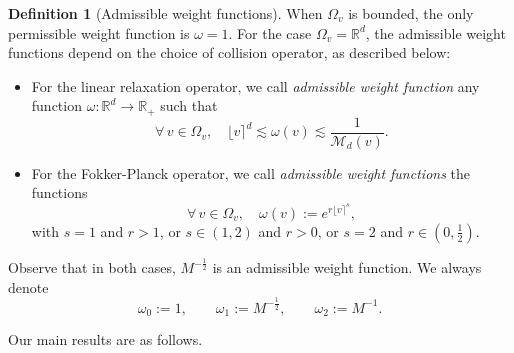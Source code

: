 \documentclass[11pt]{amsart}
\theoremstyle{definition}
\newtheorem{definition}[theorem]{Definition}
\theoremstyle{remark}
\numberwithin{equation}{section}
\newcommand\R{{\mathbb R}}
\def\MMM{{\mathscr M}}
\newcommand{\wangle}[1]{\lfloor #1 \rceil}
\begin{document}
\begin{definition}[Admissible weight functions]
  \label{def:admissible}
  When $\Omega_v$ is bounded, the only permissible weight function is $\omega = 1$. For the case $\Omega_v = \mathbb{R}^d$, the admissible weight functions depend on the choice of collision operator, as described below:
  \begin{itemize}
 
  \item[(i)] For the linear relaxation operator, we call \emph{admissible weight function} any function $\omega : \R^d \to \R_+$ such that
    \begin{equation*}
      \forall \, v \in \Omega_v, \quad \wangle{v}^d \lesssim \omega(v) \lesssim \frac{1}{\MMM_d(v)}.
    \end{equation*}
    \smallskip

    
  \item[(ii)] For the Fokker-Planck operator, we call \emph{admissible weight functions} the functions
    \begin{equation*}
      \forall \, v \in \Omega_v, \quad \omega(v) := e^{r \wangle{v}^s},
    \end{equation*}
    with $s=1$ and $r > 1$, or $s \in (1,2)$ and $ r > 0$, or $s=2$ and $r \in (0,\frac{1}{2})$.
  \end{itemize}
\end{definition}

\smallskip
Observe that in both cases, $M^{-\frac{1}{2}}$ is an admissible weight function. We always denote
\begin{equation}
  \label{eq:notation-weights}
  \omega_0 := 1, \qquad \omega_1 := M^{-\frac{1}{2}}, \qquad \omega_2 := M^{-1}.
\end{equation}

Our main results are as follows.
\end{document}

